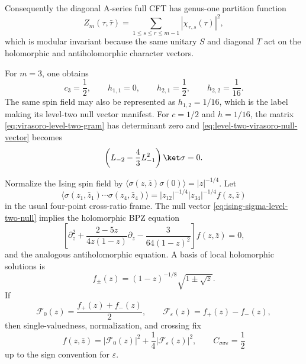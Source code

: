 Consequently the diagonal A-series full CFT has genus-one partition function
\[
  Z_m(\tau,\bar\tau)
  =
  \sum_{1\le s\le r\le m-1}
  \left|\chi_{r,s}(\tau)\right|^2,
\]
which is modular invariant because the same unitary \(S\) and diagonal \(T\)
act on the holomorphic and antiholomorphic character vectors.

For \(m=3\), one obtains
\[
  c_3=\frac12,\qquad
  h_{1,1}=0,\qquad h_{2,1}=\frac12,\qquad h_{2,2}=\frac1{16}.
\]
The same spin field may also be represented as \(h_{1,2}=1/16\), which is the
label making its level-two null vector manifest.  For
\(c=1/2\) and \(h=1/16\), the matrix
\eqref{eq:virasoro-level-two-gram} has determinant zero and
\eqref{eq:level-two-virasoro-null-vector} becomes
\begin{equation}
  \left(L_{-2}-\frac43 L_{-1}^2\right)\ket\sigma=0.
  \label{eq:ising-sigma-level-two-null}
\end{equation}

\begin{proposition}
\label{prop:ising-spin-bpz-four-point}
Normalize the Ising spin field by
\(\langle\sigma(z,\bar z)\sigma(0)\rangle=|z|^{-1/4}\).  Let
\[
  \langle\sigma(z_1,\bar z_1)\cdots\sigma(z_4,\bar z_4)\rangle
  =
  |z_{12}|^{-1/4}|z_{34}|^{-1/4}f(z,\bar z)
\]
in the usual four-point cross-ratio frame.  The null vector
\eqref{eq:ising-sigma-level-two-null} implies the holomorphic BPZ equation
\begin{equation}
  \left[
    \partial_z^2
    +\frac{2-5z}{4z(1-z)}\partial_z
    -\frac{3}{64(1-z)^2}
  \right]f(z,\bar z)=0,
  \label{eq:ising-sigma-bpz-equation}
\end{equation}
and the analogous antiholomorphic equation.  A basis of local holomorphic
solutions is
\[
  f_\pm(z)=(1-z)^{-1/8}\sqrt{1\pm\sqrt z}.
\]
If
\[
  \mathcal F_0(z)=\frac{f_+(z)+f_-(z)}2,\qquad
  \mathcal F_{\varepsilon}(z)=f_+(z)-f_-(z),
\]
then single-valuedness, normalization, and crossing fix
\begin{equation}
  f(z,\bar z)
  =
  |\mathcal F_0(z)|^2+\frac14|\mathcal F_{\varepsilon}(z)|^2,
  \qquad
  C_{\sigma\sigma\varepsilon}=\frac12
  \label{eq:ising-spin-four-point-structure-constant}
\end{equation}
up to the sign convention for \(\varepsilon\).
\end{proposition}

